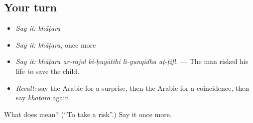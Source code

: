 \subsection*{Your turn}
\begin{itemize}
\raggedright
  \item \emph{Say it:} \emph{khāṭara}
  \item \emph{Say it:} \emph{khāṭara}, once more
  \item \emph{Say it:} \emph{khāṭara ar-rajul bi-ḥayātihi li-yunqidha aṭ-ṭifl.} — The man risked his life to save the child.
  \item \emph{Recall:} say the Arabic for a surprise, then the Arabic for a coincidence, then say \emph{khāṭara} again
\end{itemize}

\begin{tcolorbox}[breakable,colback=teal!4,colframe=teal!35!black,title={Before you move on}]
What does  mean? (\textquotedblleft{}To take a risk\textquotedblright{}.) Say it once more.
\end{tcolorbox}
